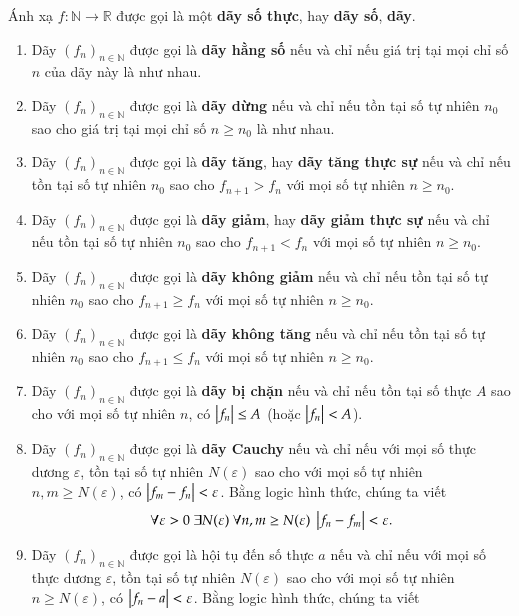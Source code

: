 \begin{definition}
    Ánh xạ $f: \mathbb{N}\to \mathbb{R}$ được gọi là một \textbf{dãy số thực}, hay \textbf{dãy số}, \textbf{dãy}.
    \begin{enumerate}[label={(\roman*)}]
        \item Dãy ${(f_{n})}_{n\in\mathbb{N}}$ được gọi là \textbf{dãy hằng số} nếu và chỉ nếu giá trị tại mọi chỉ số $n$ của dãy này là như nhau.
        \item Dãy ${(f_{n})}_{n\in\mathbb{N}}$ được gọi là \textbf{dãy dừng} nếu và chỉ nếu tồn tại số tự nhiên $n_{0}$ sao cho giá trị tại mọi chỉ số $n\geq n_{0}$ là như nhau.
        \item Dãy ${(f_{n})}_{n\in\mathbb{N}}$ được gọi là \textbf{dãy tăng}, hay \textbf{dãy tăng thực sự} nếu và chỉ nếu tồn tại số tự nhiên $n_{0}$ sao cho $f_{n+1} > f_{n}$ với mọi số tự nhiên $n\geq n_{0}$.
        \item Dãy ${(f_{n})}_{n\in\mathbb{N}}$ được gọi là \textbf{dãy giảm}, hay \textbf{dãy giảm thực sự} nếu và chỉ nếu tồn tại số tự nhiên $n_{0}$ sao cho $f_{n+1} < f_{n}$ với mọi số tự nhiên $n\geq n_{0}$.
        \item Dãy ${(f_{n})}_{n\in\mathbb{N}}$ được gọi là \textbf{dãy không giảm} nếu và chỉ nếu tồn tại số tự nhiên $n_{0}$ sao cho $f_{n+1}\geq f_{n}$ với mọi số tự nhiên $n\geq n_{0}$.
        \item Dãy ${(f_{n})}_{n\in\mathbb{N}}$ được gọi là \textbf{dãy không tăng} nếu và chỉ nếu tồn tại số tự nhiên $n_{0}$ sao cho $f_{n+1}\leq f_{n}$ với mọi số tự nhiên $n\geq n_{0}$.
        \item Dãy ${(f_{n})}_{n\in\mathbb{N}}$ được gọi là \textbf{dãy bị chặn} nếu và chỉ nếu tồn tại số thực $A$ sao cho với mọi số tự nhiên $n$, có $\left\vert{f_{n}}\right\vert\leq A$ (hoặc $\left\vert{f_{n}}\right\vert < A$).
        \item Dãy ${(f_{n})}_{n\in\mathbb{N}}$ được gọi là \textbf{dãy Cauchy} nếu và chỉ nếu với mọi số thực dương $\varepsilon$, tồn tại số tự nhiên $N(\varepsilon)$ sao cho với mọi số tự nhiên $n, m\geq N(\varepsilon)$, có $\left\vert{f_{m} - f_{n}}\right\vert < \varepsilon$. Bằng logic hình thức, chúng ta viết
              \[
                  \forall \varepsilon > 0\ \exists N(\varepsilon)\ \forall n, m\geq N(\varepsilon)\ \left\vert{f_{n} - f_{m}}\right\vert < \varepsilon.
              \]
        \item Dãy ${(f_{n})}_{n\in\mathbb{N}}$ được gọi là hội tụ đến số thực $a$ nếu và chỉ nếu với mọi số thực dương $\varepsilon$, tồn tại số tự nhiên $N(\varepsilon)$ sao cho với mọi số tự nhiên $n\geq N(\varepsilon)$, có $\left\vert{f_{n} - a}\right\vert < \varepsilon$. Bằng logic hình thức, chúng ta viết

\end{enumerate}
\end{definition}
